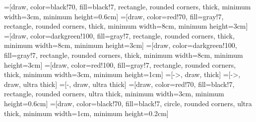 
\def\R{ \ensuremath{\mathcal{R}} }
\def\C{ \ensuremath{\mathcal{C}} }
\def\N{ \ensuremath{\mathcal{N}} }
\def\SV{ \ensuremath{\mathcal{SV}} }
=[draw, color=black!70, fill=black!7, rectangle, rounded
corners, thick, minimum width=3cm, minimum height=0.6cm]
=[draw, color=red!70, fill=gray!7, rectangle, rounded
corners, thick, minimum width=8cm, minimum height=3cm]
=[draw, color=darkgreen!100, fill=gray!7, rectangle, rounded
corners, thick, minimum width=8cm, minimum height=3cm]
=[draw, color=darkgreen!100, fill=gray!7, rectangle, rounded
corners, thick, minimum width=8cm, minimum height=3cm]
=[draw, color=red!100, fill=gray!7, rectangle, rounded
corners, thick, minimum width=3cm, minimum height=1cm]
=[->, draw, thick]
=[->, draw, ultra thick]
=[-, draw, ultra thick]
=[draw, color=red!70, fill=black!7, rectangle, rounded
corners, ultra thick, minimum width=3cm, minimum height=0.6cm]
=[draw, color=black!70, fill=black!7, circle, rounded
corners, ultra thick, minimum width=1cm, minimum height=0.2cm]
\newcommand\framepicture[1]{
\begin{center}
		\begin{tikzpicture}
			\node[taskRect] at (0,3) {
			\begin{minipage}[t][4cm]{7cm}
		\texttt{[image: \#1]} 
		\end{minipage}
		};
	\end{tikzpicture}
\end{center}
}
\newcommand\drawDirectedGraph[2]{
\node[nUnit] (h) at (#2,#1) {h};
\node[nUnit] (v1) at (#2-1,#1-2) {v1};
\node[nUnit] (v2) at (#2+1,#1-2) {v2};
\draw[darrow] (v1) -- (h);
\draw[darrow] (v2) -- (h);
\draw[darrow] (h) -- (#2,#1+1);
}
\newcommand\drawUndirectedGraph[2]{
	\node[nUnit] (uh) at (#2,#1) {h};
	\node[nUnit] (uv1) at (#2-1,#1-2) {v1};
	\node[nUnit] (uv2) at (#2+1,#1-2) {v2};
	\draw[uarrow] (uv1) -- (uh);
	\draw[uarrow] (uv2) -- (uh);
}

